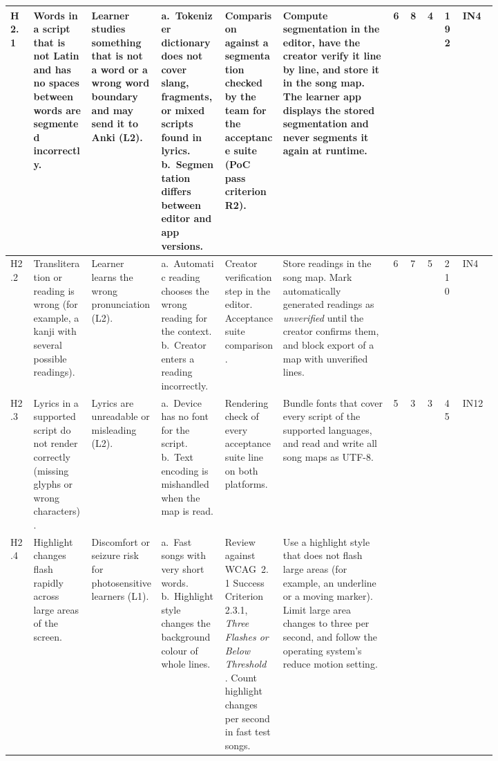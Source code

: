 \documentclass{article}
\begin{document}
\begin{landscape}
\begin{longtable}{P{0.04\linewidth}P{0.10\linewidth}P{0.12\linewidth}P{0.11\linewidth}P{0.10\linewidth}P{0.19\linewidth}P{0.022\linewidth}P{0.022\linewidth}P{0.022\linewidth}P{0.03\linewidth}P{0.06\linewidth}}
\midrule
H2.1 & Words in a script that is not Latin and has no spaces between words are segmented incorrectly. &
Learner studies something that is not a word or a wrong word boundary and may send it to Anki
(L2). &
a.~Tokenizer dictionary does not cover slang, fragments, or mixed scripts
found in lyrics.\newline
b.~Segmentation differs between editor and app versions. &
Comparison against a segmentation checked by the team for the acceptance suite
(PoC pass criterion R2). &
Compute segmentation in the editor, have the creator verify it line by line,
and store it in the song map. The learner app displays the stored segmentation
and never segments it again at runtime. &
6 & 8 & 4 & 192 & IN4\\
\midrule
H2.2 & Transliteration or reading is wrong (for example, a kanji with several
possible readings). &
Learner learns the wrong pronunciation (L2). &
a.~Automatic reading chooses the wrong reading for the context.\newline
b.~Creator enters a reading incorrectly. &
Creator verification step in the editor. Acceptance suite comparison. &
Store readings in the song map. Mark automatically generated readings as
\emph{unverified} until the creator confirms them, and block export of a map
with unverified lines. &
6 & 7 & 5 & 210 & IN4\\
\midrule
H2.3 & Lyrics in a supported script do not render correctly (missing glyphs or
wrong characters). &
Lyrics are unreadable or misleading (L2). &
a.~Device has no font for the script.\newline
b.~Text encoding is mishandled when the map is read. &
Rendering check of every acceptance suite line on both platforms. &
Bundle fonts that cover every script of the supported languages, and read and
write all song maps as UTF-8. &
5 & 3 & 3 & 45 & IN12\\
\midrule
H2.4 & Highlight changes flash rapidly across large areas of the screen. &
Discomfort or seizure risk for photosensitive learners (L1). &
a.~Fast songs with very short words.\newline
b.~Highlight style changes the background colour of whole lines. &
Review against WCAG~2.1 Success Criterion 2.3.1, \emph{Three Flashes or
Below Threshold}~\cite{WCAG21, WCAG231}. Count highlight
changes per second in fast test songs. &
Use a highlight style that does not flash large areas (for example, an
underline or a moving marker). Limit large area changes to three per second,
and follow the operating system's reduce motion setting. &

\end{longtable}
\end{landscape}
\end{document}
